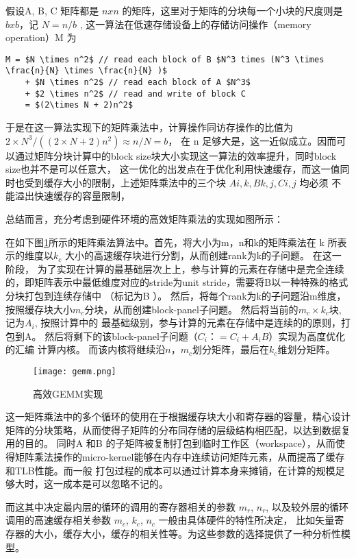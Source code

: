 假设A, B, C 矩阵都是 $n x n$ 的矩阵，这里对于矩阵的分块每一个小块的尺度则是 $b x b$，记 $N = n / b$ , 这一算法在低速存储设备上的存储访问操作（memory operation）M 为

\begin{lstlisting}[mathescape=true, label={eq:mem_access}]
    M = $N \times n^2$ // read each block of B $N^3 times (N^3 \times \frac{n}{N} \times \frac{n}{N} )$
	+ $N \times n^2$ // read each block of A $N^3$
	+ $2 \times n^2$ // read and write of block C
	= $(2\times N + 2)n^2$
\end{lstlisting}

于是在这一算法实现下的矩阵乘法中，计算操作同访存操作的比值为 $2\times N^3 / ((2\times N + 2)n^2) \approx n / N = b$，
在 n 足够大是，这一近似成立。因而可以通过矩阵分块计算中的block size块大小实现这一算法的效率提升，同时block size也并不是可以任意大，
这一优化的出发点在于优化利用快速缓存，而这一值同时也受到缓存大小的限制，上述矩阵乘法中的三个块 $A{i, k}, B{k, j}, C{i, j} $ 均必须
不能溢出快速缓存的容量限制，

总结而言，充分考虑到硬件环境的高效矩阵乘法的实现如图所示：

在如下图\ref{fig:gemm}所示的矩阵乘法算法中。首先，将大小为m，n和k的矩阵乘法在 k 所表示的维度以$k_c$ 大小的高速缓存块进行分割，从而创建rank为k的子问题。 在这一阶段，
为了实现在计算的最基础层次上上，参与计算的元素在存储中是完全连续的，即矩阵表示中最低维度对应的stride为unit stride，需要将B以一种特殊的格式分块打包到连续存储中
（标记为B ）。 然后，将每个rank为k的子问题沿m维度，按照缓存块大小$m_c$分块，从而创建block-panel子问题。 然后将当前的$m_c×k_c$块, 记为$A_i$, 按照计算中的
最基础级别，参与计算的元素在存储中是连续的的原则，打包到A。 然后将剩下的该block-panel子问题（$C_i：= C_i + A_i B$）实现为高度优化的汇编
计算内核。 而该内核将继续沿$n$，$m_c$划分矩阵，最后在$k_c$维划分矩阵。

\begin{figure}
\centering
\texttt{[image: gemm.png]}
\caption{高效GEMM实现}
\label{fig:gemm}
\end{figure}

这一矩阵乘法中的多个循环的使用在于根据缓存块大小和寄存器的容量，精心设计矩阵的分块策略，从而使得子矩阵的分布同存储的层级结构相匹配，以达到数据复用的目的。
同时A 和B 的子矩阵被复制打包到临时工作区（workspace），从而使得矩阵乘法操作的micro-kernel能够在内存中连续访问矩阵元素，从而提高了缓存和TLB性能。而一般
打包过程的成本可以通过计算本身来摊销，在计算的规模足够大时，这一成本是可以忽略不记的。

而这其中决定最内层的循环的调用的寄存器相关的参数 $m_r$, $n_r$, 以及较外层的循环调用的高速缓存相关参数 $m_c$, $k_c$, $n_c$ 一般由具体硬件的特性所决定，
比如矢量寄存器的大小，缓存大小，缓存的相关性等。\cite{Low2016AnalyticalMI}为这些参数的选择提供了一种分析性模型。



